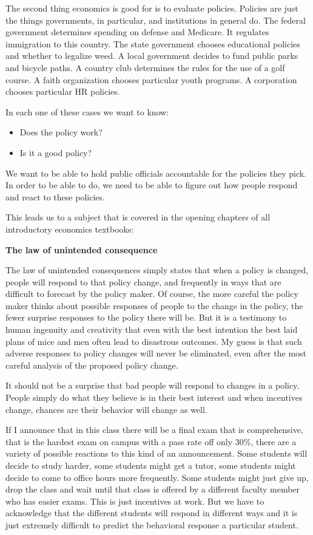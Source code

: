 \documentclass[
]{book}
\providecommand{\tightlist}{%
  \setlength{\itemsep}{0pt}\setlength{\parskip}{0pt}}
\begin{document}
The second thing economics is good for is to evaluate policies. Policies are just the things governments, in particular, and institutions in general do. The federal government determines spending on defense and Medicare. It regulates immigration to this country. The state government chooses educational policies and whether to legalize weed. A local government decides to fund public parks and bicycle paths. A country club determines the rules for the use of a golf course. A faith organization chooses particular youth programs. A corporation chooses particular HR policies.

In each one of these cases we want to know:

\begin{itemize}
\tightlist
\item
  Does the policy work?
\item
  Is it a good policy?
\end{itemize}

We want to be able to hold public officials accountable for the policies they pick. In order to be able to do, we need to be able to figure out how people respond and react to these policies.

This leads us to a subject that is covered in the opening chapters of all introductory economics textbooks:

\textbf{The law of unintended consequence}

The law of unintended consequences simply states that when a policy is changed, people will respond to that policy change, and frequently in ways that are difficult to forecast by the policy maker. Of course, the more careful the policy maker thinks about possible responses of people to the change in the policy, the fewer surprise responses to the policy there will be. But it is a testimony to human ingenuity and creativity that even with the best intention the best laid plans of mice and men often lead to disastrous outcomes. My guess is that such adverse responses to policy changes will never be eliminated, even after the most careful analysis of the proposed policy change.

It should not be a surprise that bad people will respond to changes in a policy. People simply do what they believe is in their best interest and when incentives change, chances are their behavior will change as well.

If I announce that in this class there will be a final exam that is comprehensive, that is the hardest exam on campus with a pass rate off only 30\%, there are a variety of possible reactions to this kind of an announcement. Some students will decide to study harder, some students might get a tutor, some students might decide to come to office hours more frequently. Some students might just give up, drop the class and wait until that class is offered by a different faculty member who has easier exams. This is just incentives at work. But we have to acknowledge that the different students will respond in different ways and it is just extremely difficult to predict the behavioral response a particular student.
\end{document}

